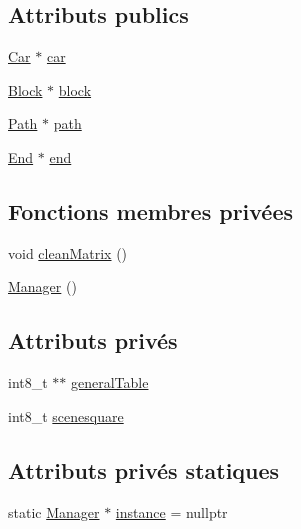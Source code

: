 \subsection*{Attributs publics}
\begin{DoxyCompactItemize}
\item 
\hyperlink{class_car}{Car} $\ast$ \hyperlink{class_manager_a2803dff8e8f2912242f4098991d91415}{car}
\item 
\hyperlink{class_block}{Block} $\ast$ \hyperlink{class_manager_a9301f6e9bd2feee2719b2ff82b49a85e}{block}
\item 
\hyperlink{class_path}{Path} $\ast$ \hyperlink{class_manager_ad9b3bf0343fe49922b1874dcb2b5c6ca}{path}
\item 
\hyperlink{class_end}{End} $\ast$ \hyperlink{class_manager_aec87028a71ab7b031977ac12a086658d}{end}
\end{DoxyCompactItemize}
\subsection*{Fonctions membres privées}
\begin{DoxyCompactItemize}
\item 
void \hyperlink{class_manager_a1734887f37a6cc8e5837431b2875459f}{clean\-Matrix} ()
\item 
\hyperlink{class_manager_a1658ff9f18e38ccd9cb8b0b371b9c20b}{Manager} ()
\end{DoxyCompactItemize}
\subsection*{Attributs privés}
\begin{DoxyCompactItemize}
\item 
int8\-\_\-t $\ast$$\ast$ \hyperlink{class_manager_ad5d59f4a2b1de265115f4efbbbc60dcd}{general\-Table}
\item 
int8\-\_\-t \hyperlink{class_manager_aee110fd8a198d0355c0475e2a8b64380}{scenesquare}
\end{DoxyCompactItemize}
\subsection*{Attributs privés statiques}
\begin{DoxyCompactItemize}
\item 
static \hyperlink{class_manager}{Manager} $\ast$ \hyperlink{class_manager_ac80f5ee151565f111593921bac645ad7}{instance} = nullptr
\end{DoxyCompactItemize}


